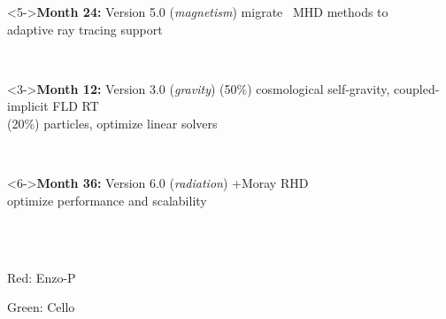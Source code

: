 \begin{frame}[fragile,label=ss-roadmap]
\begin{center}
\begin{minipage}{4.5in}
\begin{minipage}{2.0in}
\begin{block}<5->{\textbf{Month 24:} Version 5.0 (\textit{magnetism})}
\scriptsize
\textcolor{enzop}{migrate \enzo\ MHD methods to \enzop} \\
\textcolor{cello}{adaptive ray tracing support}
\end{block}
\end{minipage}
\end{minipage} \\
\begin{minipage}{4.5in}
\begin{minipage}{2.0in}
\begin{block}<3->{\textbf{Month 12:} Version 3.0 (\textit{gravity})}
\scriptsize
\textcolor{enzop}{(50\%) cosmological self-gravity, coupled-implicit FLD RT} \\
\textcolor{cello}{(20\%) particles, optimize linear solvers}
\end{block}
\end{minipage} \ 
\begin{minipage}{2.0in}
\begin{block}<6->{\textbf{Month 36:} Version  6.0 (\textit{radiation})}
\scriptsize
\textcolor{enzop}{\enzo+Moray RHD} \\
\textcolor{cello}{optimize performance and scalability} \\
\end{block}
\end{minipage}
\end{minipage}
\ \\
\ \\
\centerline{\textcolor{enzop}{Red: Enzo-P}}
\centerline{ \textcolor{cello}{Green: Cello}}
\end{center}



\end{frame}

